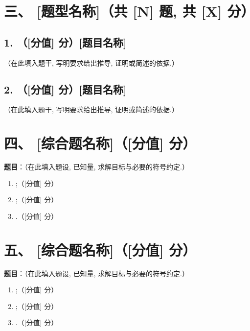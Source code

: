 \documentclass[11pt,a4paper,UTF8]{ctexart}
\begin{document}
\section*{三、 [题型名称]（共 [N] 题, 共 [X] 分）}
\subsection*{1. （[分值] 分）[题目名称]}
（在此填入题干, 写明要求给出推导, 证明或简述的依据.）

\vspace{5cm}

\subsection*{2. （[分值] 分）[题目名称]}
（在此填入题干, 写明要求给出推导, 证明或简述的依据.）

\vspace{5cm}

\section*{四、 [综合题名称]（[分值] 分）}
\textbf{题目}：（在此填入题设, 已知量, 求解目标与必要的符号约定.）\\
\begin{enumerate}[label=(\arabic*)]
    \item [第一问要求];（[分值] 分）
    \item [第二问要求];（[分值] 分）
    \item [结果检验或讨论要求].（[分值] 分）
\end{enumerate}

\newpage
\section*{五、 [综合题名称]（[分值] 分）}
\textbf{题目}：（在此填入题设, 已知量, 求解目标与必要的符号约定.）\\
\begin{enumerate}[label=(\arabic*)]
    \item [第一问要求];（[分值] 分）
    \item [第二问要求];（[分值] 分）
    \item [结果检验或讨论要求].（[分值] 分）
\end{enumerate}

\end{document}
